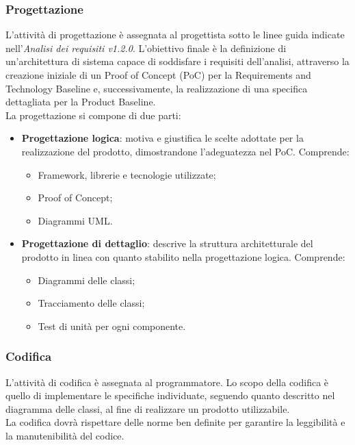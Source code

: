 \subsubsection{Progettazione}
L'attività di progettazione è assegnata al progettista sotto le linee guida
indicate nell'\textit{Analisi dei requisiti v1.2.0}. L'obiettivo finale è la
definizione di un'architettura di sistema capace di soddisfare i requisiti
dell'analisi, attraverso la creazione iniziale di un Proof of Concept (PoC) per
la Requirements and Technology Baseline e, successivamente, la realizzazione di una
specifica dettagliata per la Product Baseline. \\
La progettazione si compone di due parti:
\begin{itemize}
    \item \textbf{Progettazione logica}: motiva e giustifica le scelte adottate per la realizzazione del prodotto, 
    dimostrandone l'adeguatezza nel PoC. Comprende:
          \begin{itemize}
              \item Framework, librerie e tecnologie utilizzate;
              \item Proof of Concept;
              \item Diagrammi UML.
          \end{itemize}
    \item \textbf{Progettazione di dettaglio}: descrive la struttura architetturale del prodotto in linea con quanto 
    stabilito nella progettazione logica. Comprende:
          \begin{itemize}
              \item Diagrammi delle classi;
              \item Tracciamento delle classi;
              \item Test di unità per ogni componente.
          \end{itemize}
\end{itemize}

\subsubsection{Codifica}
L'attività di codifica è assegnata al programmatore. Lo scopo della codifica è quello di 
implementare le specifiche individuate, seguendo quanto descritto nel
diagramma delle classi, al fine di realizzare un prodotto utilizzabile. \\
La codifica dovrà rispettare delle norme ben definite per garantire la leggibilità
e la manutenibilità del codice.

